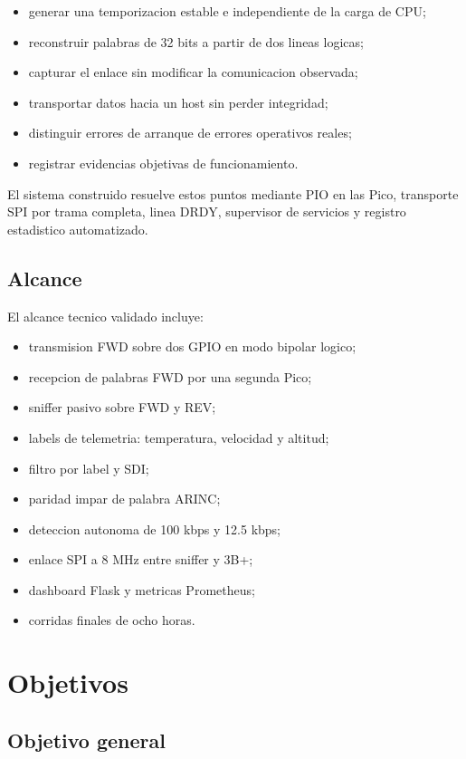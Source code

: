 \documentclass[12pt,a4paper,oneside]{report}
\begin{document}
\begin{itemize}
  \item generar una temporizacion estable e independiente de la carga de CPU;
  \item reconstruir palabras de 32 bits a partir de dos lineas logicas;
  \item capturar el enlace sin modificar la comunicacion observada;
  \item transportar datos hacia un host sin perder integridad;
  \item distinguir errores de arranque de errores operativos reales;
  \item registrar evidencias objetivas de funcionamiento.
\end{itemize}

El sistema construido resuelve estos puntos mediante PIO en las Pico,
transporte SPI por trama completa, linea DRDY, supervisor de servicios y
registro estadistico automatizado.

\section{Alcance}

El alcance tecnico validado incluye:

\begin{itemize}
  \item transmision FWD sobre dos GPIO en modo bipolar logico;
  \item recepcion de palabras FWD por una segunda Pico;
  \item sniffer pasivo sobre FWD y REV;
  \item labels de telemetria: temperatura, velocidad y altitud;
  \item filtro por label y SDI;
  \item paridad impar de palabra ARINC;
  \item deteccion autonoma de 100 kbps y 12.5 kbps;
  \item enlace SPI a 8 MHz entre sniffer y 3B+;
  \item dashboard Flask y metricas Prometheus;
  \item corridas finales de ocho horas.
\end{itemize}

\chapter{Objetivos}

\section{Objetivo general}
\end{document}
